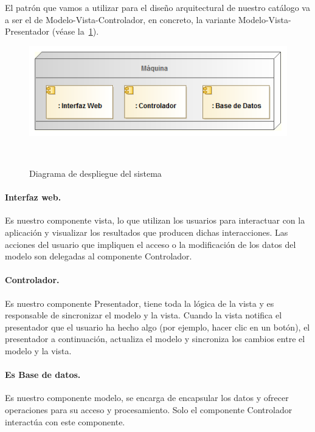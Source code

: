 El patrón que vamos a utilizar para el diseño arquitectural de nuestro 
catálogo va a ser el de Modelo-Vista-Controlador, en concreto, la variante Modelo-Vista-Presentador 
(véase la~\cref{fig:diagDespliegue}).

\vspace{.2cm}
\begin{figure}[ht]
\centerline{\includegraphics[scale=0.6]{img/diagrama_despliegue}}\
\caption{Diagrama de despliegue del sistema}
\label{fig:diagDespliegue}
\end{figure}


\paragraph{Interfaz web.} Es nuestro componente vista, lo que utilizan los usuarios para 
interactuar con la aplicación y visualizar los resultados que producen dichas
interacciones. Las acciones del usuario que impliquen el acceso o la modificación
de los datos del modelo son delegadas al componente Controlador.

\paragraph{Controlador.} Es nuestro componente Presentador, tiene toda la lógica de la vista 
y es responsable de sincronizar el modelo y la vista. Cuando la vista notifica el 
presentador que el usuario ha hecho algo (por ejemplo, hacer clic en un botón), 
el presentador a continuación, actualiza el modelo y sincroniza los cambios 
entre el modelo y la vista.

\paragraph{Es Base de datos.} Es nuestro componente modelo, se encarga de encapsular 
los datos y ofrecer operaciones para su acceso y procesamiento. Solo el componente
Controlador interactúa con este componente.